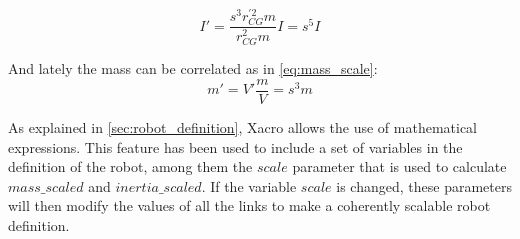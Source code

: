 \begin{equation}
\label{eq:inertia_scale}
  I' = \frac{s^{3} r_{CG}^{'2} m}{r_{CG}^{2} m} I = s^{5} I
\end{equation}

And lately the mass can be correlated as in \ref{eq:mass_scale}:
\begin{equation}
\label{eq:mass_scale}
  m' = V' \frac{m}{V} = s^{3}m
\end{equation}

As explained in \ref{sec:robot_definition}, Xacro allows the use of mathematical expressions. 
This feature has been used to include a set of variables in the definition of the robot, among them the $scale$ parameter that is used to calculate $mass\_scaled$ and $inertia\_scaled$.
If the variable $scale$ is changed, these parameters will then modify the values of all the links to make a coherently scalable robot definition.

